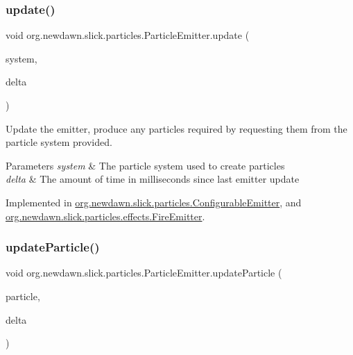 \subsubsection{\texorpdfstring{update()}{update()}}
{\footnotesize\ttfamily void org.\+newdawn.\+slick.\+particles.\+Particle\+Emitter.\+update (\begin{DoxyParamCaption}\item[{\mbox{\hyperlink{classorg_1_1newdawn_1_1slick_1_1particles_1_1_particle_system}{Particle\+System}}}]{system,  }\item[{int}]{delta }\end{DoxyParamCaption})}

Update the emitter, produce any particles required by requesting them from the particle system provided.


\begin{DoxyParams}{Parameters}
{\em system} & The particle system used to create particles \\
\hline
{\em delta} & The amount of time in milliseconds since last emitter update \\
\hline
\end{DoxyParams}


Implemented in \mbox{\hyperlink{classorg_1_1newdawn_1_1slick_1_1particles_1_1_configurable_emitter_a982eeb3a795db37d7065e8b20868281c}{org.\+newdawn.\+slick.\+particles.\+Configurable\+Emitter}}, and \mbox{\hyperlink{classorg_1_1newdawn_1_1slick_1_1particles_1_1effects_1_1_fire_emitter_a377a97e3799473ee2e2f026ac4530ad4}{org.\+newdawn.\+slick.\+particles.\+effects.\+Fire\+Emitter}}.

\mbox{\label{interfaceorg_1_1newdawn_1_1slick_1_1particles_1_1_particle_emitter_ac0792f19fdebd62a321bcdc487e0cba5}} 
\subsubsection{\texorpdfstring{update\+Particle()}{updateParticle()}}
{\footnotesize\ttfamily void org.\+newdawn.\+slick.\+particles.\+Particle\+Emitter.\+update\+Particle (\begin{DoxyParamCaption}\item[{\mbox{\hyperlink{classorg_1_1newdawn_1_1slick_1_1particles_1_1_particle}{Particle}}}]{particle,  }\item[{int}]{delta }\end{DoxyParamCaption})}

